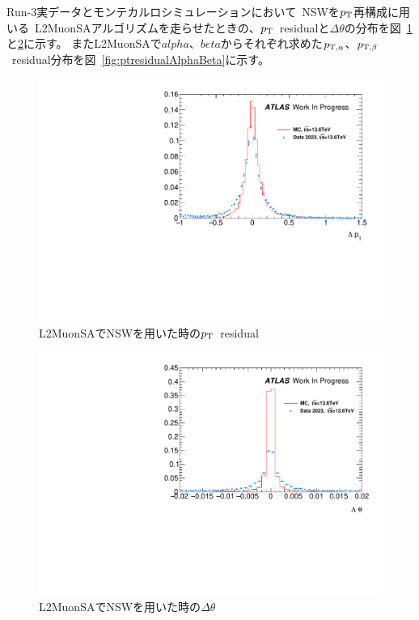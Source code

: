 Run-3実データとモンテカルロシミュレーションにおいて~NSWを$p_\mathrm{T}$再構成に用いる~L2MuonSAアルゴリズムを走らせたときの、$p_\mathrm{T}$~residualと$\Delta\theta$の分布を図~\ref{fig:ptresidualDataMC}と\ref{fig:deltaThetaDataMC}に示す。
またL2MuonSAで$alpha$、$beta$からそれぞれ求めた$p_{\rm{T, \alpha}}$、$p_{\rm{T, \beta}}$~residual分布を図~\ref{fig:ptresidualAlphaBeta}に示す。

\begin{figure}[H]
    \centering
    \includegraphics[clip, width=12cm]{fig/5/ptresidual_NSW.pdf}
    \caption{L2MuonSAでNSWを用いた時の$p_\mathrm{T}$~residual}
    \label{fig:ptresidualDataMC}
\end{figure}

\begin{figure}[H]
    \centering
    \includegraphics[clip, width=12cm]{fig/5/deltaTheta_NSW.pdf}
    \caption{L2MuonSAでNSWを用いた時の$\Delta \theta$}
    \label{fig:deltaThetaDataMC}
\end{figure}

